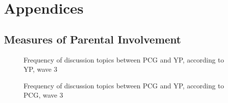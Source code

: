 \documentclass[a4paper]{article}
\begin{document}
\clearpage
\section{Appendices}
\subsection{Measures of Parental Involvement}
\begin{figure}[htbp] 
    \centering
    \caption{Frequency of discussion topics between PCG and YP, according to YP, wave 3}
    \label{}
\end{figure}

\begin{figure}[htbp] 
    \centering
    \caption{Frequency of discussion topics between PCG and YP, according to PCG, wave 3}
    \label{}
\end{figure}
\end{document}
